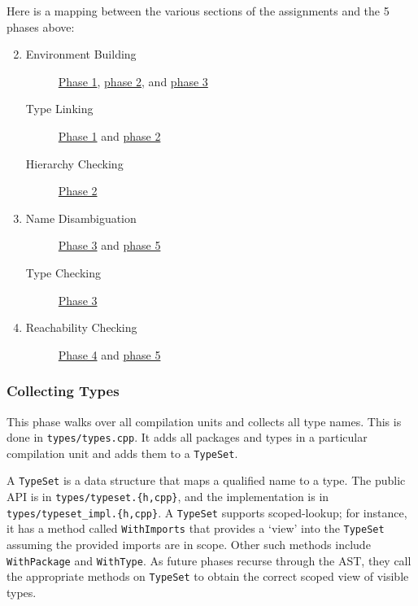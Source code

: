 \documentclass[12pt, titlepage]{article}
\newcommand{\z}[1]{\texttt{#1}}
\begin{document}
Here is a mapping between the various sections of the assignments and the 5
phases above:
\begin{enumerate}[\bf{A}1\ \ ]
  \setcounter{enumi}{1}

  \item
  \begin{description}
    \item[Environment Building]
      \hyperref[subsubsec:col-types]{Phase 1}, \hyperref[subsubsec:fields]{phase 2},
      and \hyperref[subsubsec:type-checking]{phase 3}
    \item[Type Linking]
      \hyperref[subsubsec:col-types]{Phase 1} and \hyperref[subsubsec:fields]{phase 2}
    \item[Hierarchy Checking]
      \hyperref[subsubsec:fields]{Phase 2}
  \end{description}

  \item
  \begin{description}
    \item[Name Disambiguation]
      \hyperref[subsubsec:type-checking]{Phase 3} and \hyperref[subsubsec:data-flow]{phase 5}
    \item[Type Checking]
      \hyperref[subsubsec:type-checking]{Phase 3}
  \end{description}

  \item
  \begin{description}
    \item[Reachability Checking]
      \hyperref[subsubsec:const-prop]{Phase 4} and \hyperref[subsubsec:data-flow]{phase 5}
  \end{description}
\end{enumerate}

\subsubsection{Collecting Types}\label{subsubsec:col-types}

This phase walks over all compilation units and collects all type names. This
is done in \z{types/types.cpp}. It adds all packages and types in a particular
compilation unit and adds them to a \z{TypeSet}.

A \z{TypeSet} is a data structure that maps a qualified name to a type. The
public API is in \z{types/typeset.\{h,cpp\}}, and the implementation is in
\z{types/typeset\_impl.\{h,cpp\}}. A \z{TypeSet} supports scoped-lookup; for instance,
it has a method called \z{WithImports} that provides a `view' into the \z{TypeSet}
assuming the provided imports are in scope. Other such methods include
\z{WithPackage} and \z{WithType}. As future phases recurse through the AST, they
call the appropriate methods on \z{TypeSet} to obtain the correct scoped view of
visible types.
\end{document}
